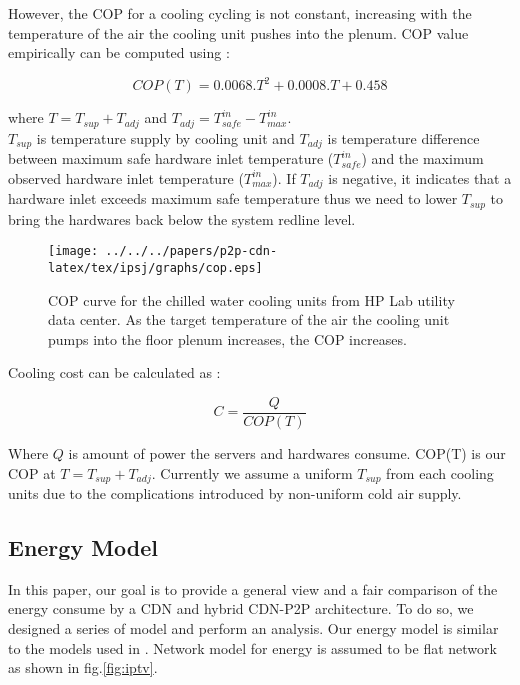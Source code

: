 However, the COP for a cooling cycling is not constant, increasing with the temperature of the air the cooling unit pushes into the plenum.  
COP value empirically can be computed using \cite{moore2005making}:

\begin{equation}\label{eqn:copt}
	COP(T) = 0.0068.T^2 + 0.0008.T + 0.458
\end{equation}

where $T = T_{sup} + T_{adj}$ and $T_{adj} = T_{safe}^{in}-T_{max}^{in}$. \\
$T_{sup}$ is temperature supply by cooling unit and $T_{adj}$ is temperature difference between maximum safe hardware inlet temperature ($T_{safe}^{in}$) and the maximum observed hardware inlet temperature ($T_{max}^{in}$).
If $T_{adj}$ is negative, it indicates that a hardware inlet exceeds maximum safe temperature thus we need to lower $T_{sup}$ to bring the hardwares back below the system redline level.

\begin{figure}[thb]
\begin{center}
\texttt{[image: ../../../papers/p2p-cdn-latex/tex/ipsj/graphs/cop.eps]}
\end{center}
\caption{COP curve for the chilled water cooling units from HP Lab utility data center.
As the target temperature of the air the cooling unit pumps into the floor plenum increases, the COP increases.}
\label{fig:twotier}
\end{figure} 

Cooling cost can be calculated as  \cite{moore2005making} :

\begin{equation}\label{eqn:cost}
C = \frac{Q}{COP(T)}
\end{equation}

Where $Q$ is amount of power the servers and hardwares consume.
COP(T) is our COP at $T=T_{sup}+T_{adj}$.
Currently we assume a uniform $T_{sup}$ from each cooling units due to the complications introduced by non-uniform cold air supply.


\subsection{Energy Model}\label{energy model}

In this paper, our goal is to provide a general view and a fair comparison of the energy consume by a CDN and hybrid CDN-P2P architecture. 
To do so, we designed a series of model and perform an analysis.
Our energy model is similar to the models used in \cite{Nedevschi:2008:HDC:1855610.1855618}.
Network model for energy is assumed to be flat network as shown in fig.\ref{fig:iptv}.

